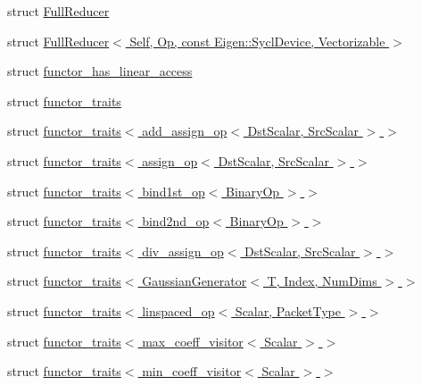 \begin{DoxyCompactItemize}
struct \hyperlink{struct_eigen_1_1internal_1_1_full_reducer}{Full\+Reducer}
\item 
struct \hyperlink{struct_eigen_1_1internal_1_1_full_reducer_3_01_self_00_01_op_00_01const_01_eigen_1_1_sycl_device_00_01_vectorizable_01_4}{Full\+Reducer$<$ Self, Op, const Eigen\+::\+Sycl\+Device, Vectorizable $>$}
\item 
struct \hyperlink{struct_eigen_1_1internal_1_1functor__has__linear__access}{functor\+\_\+has\+\_\+linear\+\_\+access}
\item 
struct \hyperlink{struct_eigen_1_1internal_1_1functor__traits}{functor\+\_\+traits}
\item 
struct \hyperlink{struct_eigen_1_1internal_1_1functor__traits_3_01add__assign__op_3_01_dst_scalar_00_01_src_scalar_01_4_01_4}{functor\+\_\+traits$<$ add\+\_\+assign\+\_\+op$<$ Dst\+Scalar, Src\+Scalar $>$ $>$}
\item 
struct \hyperlink{struct_eigen_1_1internal_1_1functor__traits_3_01assign__op_3_01_dst_scalar_00_01_src_scalar_01_4_01_4}{functor\+\_\+traits$<$ assign\+\_\+op$<$ Dst\+Scalar, Src\+Scalar $>$ $>$}
\item 
struct \hyperlink{struct_eigen_1_1internal_1_1functor__traits_3_01bind1st__op_3_01_binary_op_01_4_01_4}{functor\+\_\+traits$<$ bind1st\+\_\+op$<$ Binary\+Op $>$ $>$}
\item 
struct \hyperlink{struct_eigen_1_1internal_1_1functor__traits_3_01bind2nd__op_3_01_binary_op_01_4_01_4}{functor\+\_\+traits$<$ bind2nd\+\_\+op$<$ Binary\+Op $>$ $>$}
\item 
struct \hyperlink{struct_eigen_1_1internal_1_1functor__traits_3_01div__assign__op_3_01_dst_scalar_00_01_src_scalar_01_4_01_4}{functor\+\_\+traits$<$ div\+\_\+assign\+\_\+op$<$ Dst\+Scalar, Src\+Scalar $>$ $>$}
\item 
struct \hyperlink{struct_eigen_1_1internal_1_1functor__traits_3_01_gaussian_generator_3_01_t_00_01_index_00_01_num_dims_01_4_01_4}{functor\+\_\+traits$<$ Gaussian\+Generator$<$ T, Index, Num\+Dims $>$ $>$}
\item 
struct \hyperlink{struct_eigen_1_1internal_1_1functor__traits_3_01linspaced__op_3_01_scalar_00_01_packet_type_01_4_01_4}{functor\+\_\+traits$<$ linspaced\+\_\+op$<$ Scalar, Packet\+Type $>$ $>$}
\item 
struct \hyperlink{struct_eigen_1_1internal_1_1functor__traits_3_01max__coeff__visitor_3_01_scalar_01_4_01_4}{functor\+\_\+traits$<$ max\+\_\+coeff\+\_\+visitor$<$ Scalar $>$ $>$}
\item 
struct \hyperlink{struct_eigen_1_1internal_1_1functor__traits_3_01min__coeff__visitor_3_01_scalar_01_4_01_4}{functor\+\_\+traits$<$ min\+\_\+coeff\+\_\+visitor$<$ Scalar $>$ $>$}

\end{DoxyCompactItemize}
